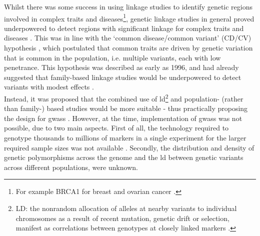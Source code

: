 Whilst there was some success in using linkage studies to identify genetic regions involved in complex traits and diseases\footnote{For example BRCA1 for breast and ovarian cancer  \cite{bailey2011linkage, miki1994strong}.},
genetic linkage studies in general proved underpowered to detect regions with significant linkage for complex traits and diseases \cite{bush2012genome, altmuller2001genomewide}. 
This was in line with the `common disease/common variant' (CD/CV) hypothesis \cite{bush2012genome, reich2001allelic}, which postulated that common traits are driven by genetic variation that is common in the population, i.e. multiple variants, each with low penetrance.
This hypothesis was described as early as 1996, and had already suggested that family-based linkage studies would be underpowered to detect variants with modest effects \cite{risch1996future}. \\

Instead, it was proposed that the combined use of \gls{ld}\footnote{LD: the nonrandom allocation of alleles at nearby variants to individual chromosomes as a result of recent mutation, genetic drift or selection, manifest as correlations between genotypes at closely linked markers \cite{mccarthy2008genome}. 
} and population- (rather than family-) based studies would be more suitable \cite{risch1996future, jorde2000linkage} - thus practically proposing the design for \glspl{gwas} \cite{risch1996future}.
However, at the time, implementation of \glspl{gwas} was not possible, due to two main aspects.
First of all, the technology required to genotype thousands to millions of markers in a single experiment for the larger required sample sizes was not available \cite{risch1996future, visscher2012five}.
Secondly, the distribution and density of genetic polymorphisms across the genome and the \gls{ld} between genetic variants across different populations, were unknown.\\

